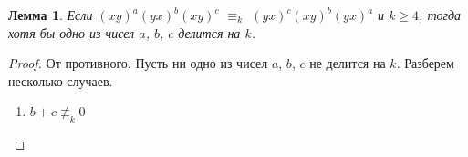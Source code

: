 \documentclass[12pt]{article}
\newtheorem{lemma}{Лемма}
\begin{document}
	\begin{lemma}
		Если $(xy)^a(yx)^b(xy)^c$ $\equiv_k$ $(yx)^c(xy)^b(yx)^a$ и $k \ge 4$, тогда хотя бы одно из чисел $a$, $b$, $c$ делится на $k$.
	\end{lemma}
	\begin{proof}
		От противного. Пусть ни одно из чисел $a$, $b$, $c$ не делится на $k$. Разберем несколько случаев.
		\begin{enumerate}
			\item $b+c \not \equiv_k 0$
		\end{enumerate}
	\end{proof}
\end{document}
